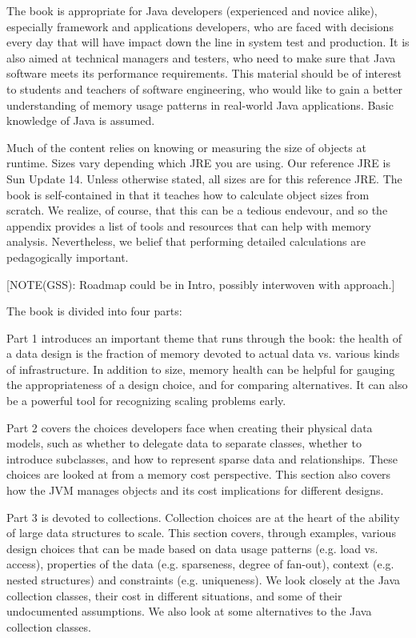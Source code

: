 The book is appropriate for Java developers (experienced and novice alike),
especially framework and applications developers, who are faced with decisions
every day that will have impact down the line in system test and production. It
is also aimed at technical managers and testers, who need to make sure that Java
software meets its performance requirements.  This material should be of
interest to students and teachers of software engineering, who would like to
gain a better understanding of memory usage patterns in real-world Java
applications. Basic knowledge of Java is assumed.

Much of the content relies on knowing or measuring the size of objects at
runtime. Sizes vary depending which JRE you are using. Our reference JRE is Sun
\javasix Update 14. Unless otherwise stated, all sizes are for this reference
JRE. The book is self-contained in that it teaches how to calculate object sizes
from scratch. We realize, of course, that this can be a tedious endevour, and so
the appendix provides a list of tools and resources that can help with memory
analysis. Nevertheless, we belief that performing detailed calculations are
pedagogically important.

[NOTE(GSS): Roadmap could be in Intro, possibly interwoven with approach.]

The book is divided into four parts:

Part 1 introduces an important theme that runs through the book: the health of a
data design is the fraction of memory devoted to actual data vs. various kinds
of infrastructure. In addition to size, memory health can be helpful for gauging
the appropriateness of a design choice, and for comparing alternatives. It can
also be a powerful tool for recognizing scaling problems early.

Part 2 covers the choices developers face when creating their physical data
models, such as whether to delegate data to separate classes, whether to
introduce subclasses, and how to represent sparse data and relationships. These
choices are looked at from a memory cost perspective. This section also covers
how the JVM manages objects and its cost implications for different designs.
  
Part 3 is devoted to collections. Collection choices are at the heart of the
ability of large data structures to scale. This section covers, through
examples, various design choices that can be made based on data usage patterns
(e.g. load vs. access), properties of the data (e.g. sparseness, degree of
fan-out), context (e.g. nested structures) and constraints (e.g. uniqueness). 
We look closely at the Java collection classes, their cost in different
situations, and some of their undocumented assumptions. We also look at some
alternatives to the Java collection classes.
 
